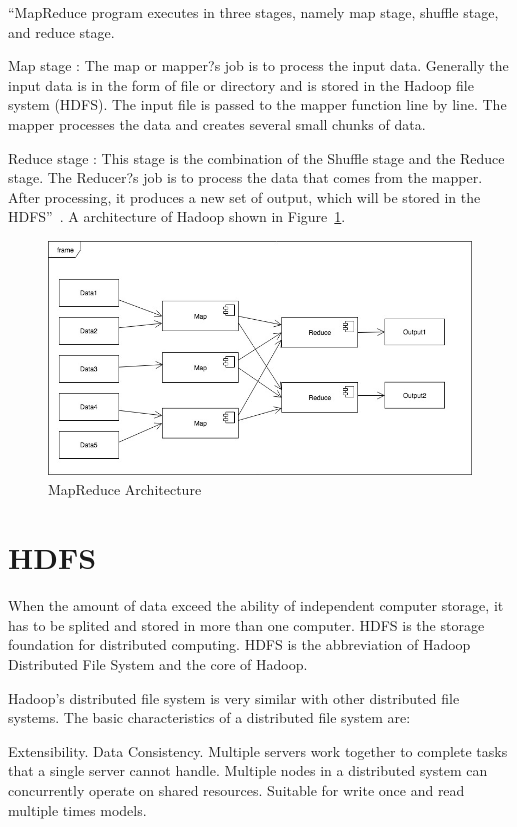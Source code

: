 ``MapReduce program executes in three stages, namely map stage, shuffle stage, 
and reduce stage.

Map stage : The map or mapper?s job is to process the input data. Generally the 
input data is in the form of file or directory and is stored in the Hadoop file 
system (HDFS). The input file is passed to the mapper function line by line. The 
mapper processes the data and creates several small chunks of data.

Reduce stage : This stage is the combination of the Shuffle stage and the Reduce 
stage. The Reducer?s job is to process the data that comes from the mapper. After 
processing, it produces a new set of output, which will be stored in the HDFS''~\cite{hid-sp18-508-mapreduce}.
A architecture of Hadoop shown in Figure~\ref{f:fly}.

\begin{figure}[!ht]
  \centering\includegraphics[width=\columnwidth]{images/mapReduce.jpg}
  \caption{MapReduce Architecture}\label{f:fly}
\end{figure}

\section{HDFS}
When the amount of data exceed the ability of independent computer storage, it 
has to be splited and stored in more than one computer. HDFS is the storage 
foundation for distributed computing. HDFS is the abbreviation of Hadoop 
Distributed File System and the core of Hadoop. 

Hadoop's distributed file system is very similar with other distributed file 
systems. The basic characteristics of a distributed file system are: 

Extensibility.
Data Consistency.
Multiple servers work together to complete tasks that a single server cannot handle.
Multiple nodes in a distributed system can concurrently operate on shared resources.
Suitable for write once and read multiple times models.


